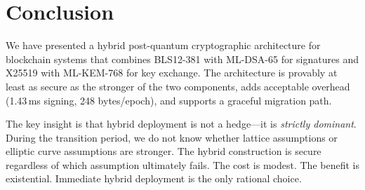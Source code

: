 \documentclass[11pt,a4paper]{article}
\begin{document}
\section{Conclusion}

We have presented a hybrid post-quantum cryptographic architecture for blockchain
systems that combines BLS12-381 with ML-DSA-65 for signatures and X25519 with
ML-KEM-768 for key exchange. The architecture is provably at least as secure as the
stronger of the two components, adds acceptable overhead (1.43\,ms signing, 248
bytes/epoch), and supports a graceful migration path.

The key insight is that hybrid deployment is not a hedge---it is \emph{strictly
dominant}. During the transition period, we do not know whether lattice assumptions
or elliptic curve assumptions are stronger. The hybrid construction is secure
regardless of which assumption ultimately fails. The cost is modest. The benefit
is existential. Immediate hybrid deployment is the only rational choice.
\end{document}
